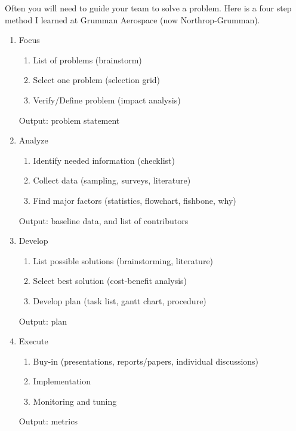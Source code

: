 Often you will need to guide your team to solve a problem.  Here is a four step method I learned at Grumman Aerospace (now Northrop-Grumman).
\begin{enumerate}
\item Focus
  \begin{enumerate}
  \item List of problems (brainstorm)
  \item Select one problem (selection grid)
  \item Verify/Define problem (impact analysis)
  \end{enumerate}
  Output: problem statement
\item Analyze
  \begin{enumerate}
  \item Identify needed information (checklist)
  \item Collect data (sampling, surveys, literature)
  \item Find major factors (statistics, flowchart, fishbone, why)
  \end{enumerate}
  Output: baseline data, and list of contributors
\item Develop
  \begin{enumerate}
  \item List possible solutions (brainstorming, literature)
  \item Select best solution (cost-benefit analysis)
  \item Develop plan (task list, gantt chart, procedure)
  \end{enumerate}
  Output: plan
\item Execute
  \begin{enumerate}
  \item Buy-in (presentations, reports/papers, individual discussions)
  \item Implementation
  \item Monitoring and tuning
  \end{enumerate}
  Output: metrics
\end{enumerate}



